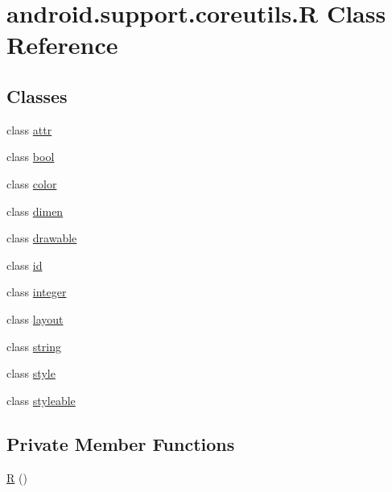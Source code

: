 \hypertarget{classandroid_1_1support_1_1coreutils_1_1_r}{}\section{android.\+support.\+coreutils.\+R Class Reference}
\label{classandroid_1_1support_1_1coreutils_1_1_r}
\subsection*{Classes}
\begin{DoxyCompactItemize}
\item 
class \mbox{\hyperlink{classandroid_1_1support_1_1coreutils_1_1_r_1_1attr}{attr}}
\item 
class \mbox{\hyperlink{classandroid_1_1support_1_1coreutils_1_1_r_1_1bool}{bool}}
\item 
class \mbox{\hyperlink{classandroid_1_1support_1_1coreutils_1_1_r_1_1color}{color}}
\item 
class \mbox{\hyperlink{classandroid_1_1support_1_1coreutils_1_1_r_1_1dimen}{dimen}}
\item 
class \mbox{\hyperlink{classandroid_1_1support_1_1coreutils_1_1_r_1_1drawable}{drawable}}
\item 
class \mbox{\hyperlink{classandroid_1_1support_1_1coreutils_1_1_r_1_1id}{id}}
\item 
class \mbox{\hyperlink{classandroid_1_1support_1_1coreutils_1_1_r_1_1integer}{integer}}
\item 
class \mbox{\hyperlink{classandroid_1_1support_1_1coreutils_1_1_r_1_1layout}{layout}}
\item 
class \mbox{\hyperlink{classandroid_1_1support_1_1coreutils_1_1_r_1_1string}{string}}
\item 
class \mbox{\hyperlink{classandroid_1_1support_1_1coreutils_1_1_r_1_1style}{style}}
\item 
class \mbox{\hyperlink{classandroid_1_1support_1_1coreutils_1_1_r_1_1styleable}{styleable}}
\end{DoxyCompactItemize}
\subsection*{Private Member Functions}
\begin{DoxyCompactItemize}
\item 
\mbox{\hyperlink{classandroid_1_1support_1_1coreutils_1_1_r_a8b937fa0ffc3844f88768f1241763f97}{R}} ()
\end{DoxyCompactItemize}


